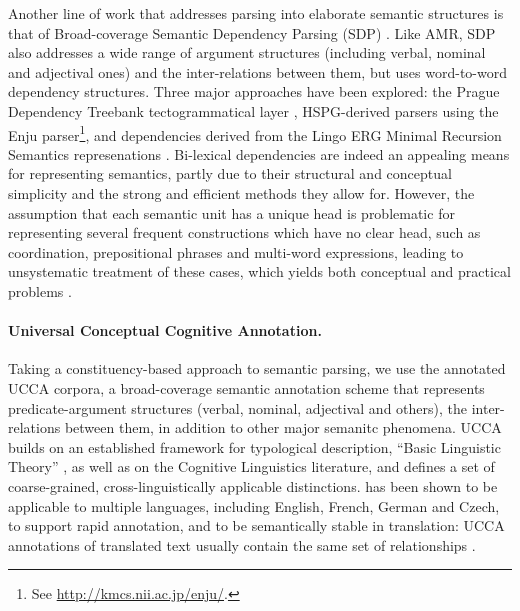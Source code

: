 \documentclass[11pt]{article}
\begin{document}
Another line of work that addresses parsing into elaborate semantic structures
is that of Broad-coverage Semantic Dependency Parsing (SDP) \cite{oepen2014semeval,oepen2015semeval}.
Like AMR, SDP also addresses a wide range of argument structures (including verbal, nominal and
adjectival ones) and the inter-relations between them, but uses word-to-word dependency structures.
Three major approaches have been explored:
the Prague Dependency Treebank tectogrammatical layer \cite{bohmova2003prague},
HSPG-derived parsers using the Enju parser\footnote{See \url{http://kmcs.nii.ac.jp/enju/}.},
and dependencies derived from the Lingo ERG Minimal Recursion Semantics represenations \cite{Flic:02}.
Bi-lexical dependencies are indeed an appealing means for representing semantics, partly due to
their structural and conceptual simplicity and the strong and efficient
methods they allow for. However, the assumption that each semantic unit has a unique head is
problematic for representing several frequent constructions which have no clear
head, such as coordination, prepositional phrases and multi-word expressions,
leading to unsystematic treatment of these cases, which yields both conceptual
and practical problems \cite{schwartz2011neutralizing,Ivanova2012who,tsarfaty2012cross}.

\paragraph{Universal Conceptual Cognitive Annotation.}
Taking a constituency-based approach to semantic parsing,
we use the annotated UCCA corpora, a broad-coverage semantic annotation scheme that
represents predicate-argument structures (verbal, nominal, adjectival and others),
the inter-relations between them, in addition to other major semanitc phenomena.
UCCA \cite{abend2013universal} builds on an established framework
for typological description, ``Basic Linguistic Theory''
\cite{Dixon:10b,Dixon:10a,Dixon:12}, as well as on the Cognitive Linguistics literature,
and defines a set of coarse-grained, cross-linguistically applicable distinctions.
has been shown to be applicable to multiple languages, including English, French, German and
Czech, to support rapid annotation, and to be semantically stable in translation: UCCA
annotations of translated text usually contain the same set of relationships
\cite{sulem2015conceptual}.
\end{document}
